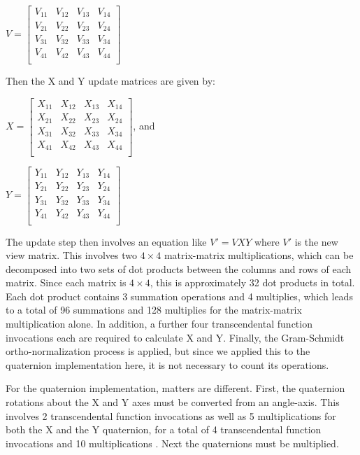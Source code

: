 \documentclass{acm_proc_article-sp}
\begin{document}
$V = \left[ \begin{array}{cccc}
    V_{11} & V_{12} & V_{13} & V_{14} \\
    V_{21} & V_{22} & V_{23} & V_{24} \\
    V_{31} & V_{32} & V_{33} & V_{34} \\
    V_{41} & V_{42} & V_{43} & V_{44} \\
\end{array} \right]$

Then the X and Y update matrices are given by:

\vspace{0.5em}
$X = \left[ \begin{array}{cccc}
    X_{11} & X_{12} & X_{13} & X_{14} \\
    X_{21} & X_{22} & X_{23} & X_{24} \\
    X_{31} & X_{32} & X_{33} & X_{34} \\
    X_{41} & X_{42} & X_{43} & X_{44} \\
\end{array} \right]$, and

$Y = \left[ \begin{array}{cccc}
    Y_{11} & Y_{12} & Y_{13} & Y_{14} \\
    Y_{21} & Y_{22} & Y_{23} & Y_{24} \\
    Y_{31} & Y_{32} & Y_{33} & Y_{34} \\
    Y_{41} & Y_{42} & Y_{43} & Y_{44} \\
\end{array} \right]$

The update step then involves an equation like $V\prime = VXY$ where $V\prime$ is the new view matrix.
This involves two $4 \times 4$ matrix-matrix multiplications, which can be decomposed into two sets of dot products between the columns and rows of each matrix.
Since each matrix is $4 \times 4$, this is approximately 32 dot products in total.
Each dot product contains 3 summation operations and 4 multiplies, which leads to a total of 96 summations and 128 multiplies for the matrix-matrix multiplication alone.
In addition, a further four transcendental function invocations each are required to calculate X and Y.
Finally, the Gram-Schmidt ortho-normalization process is applied, but since we applied this to the quaternion implementation here, it is not necessary to count its operations.

For the quaternion implementation, matters are different.
First, the quaternion rotations about the X and Y axes must be converted from an angle-axis.
This involves 2 transcendental function invocations as well as 5 multiplications for both the X and the Y quaternion, for a total of 4 transcendental function invocations and 10 multiplications \cite{glm:quat:angleAxis}.
Next the quaternions must be multiplied.
\end{document}
